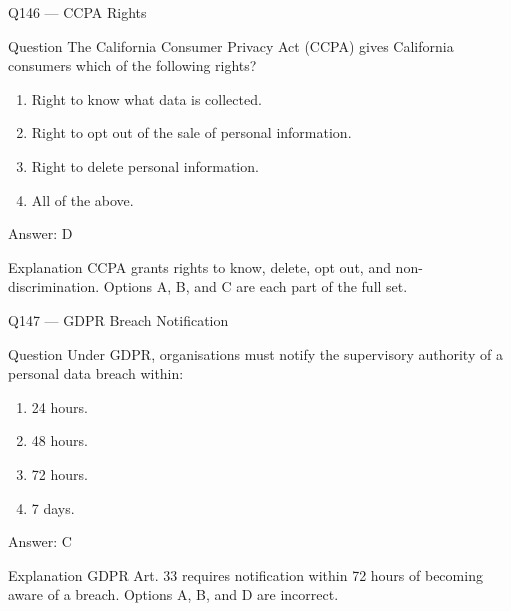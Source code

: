 \documentclass[aspectratio=169,8pt]{beamer}
\begin{document}
\begin{frame}{Q146 --- CCPA Rights}
\begin{block}{Question}
The California Consumer Privacy Act (CCPA) gives California consumers which of the following rights?
\begin{enumerate}
\item Right to know what data is collected.
\item Right to opt out of the sale of personal information.
\item Right to delete personal information.
\item All of the above.
\end{enumerate} 	\end{block}
\begin{exampleblock}{Answer: D}\end{exampleblock}
\begin{block}{Explanation}
CCPA grants rights to know, delete, opt out, and non-discrimination. Options A, B, and C are each part of the full set.
\end{block}
\end{frame}

\begin{frame}{Q147 --- GDPR Breach Notification}
\begin{block}{Question}
Under GDPR, organisations must notify the supervisory authority of a personal data breach within:
\begin{enumerate}
\item 24 hours.
\item 48 hours.
\item 72 hours.
\item 7 days.
\end{enumerate} 	\end{block}
\begin{exampleblock}{Answer: C}\end{exampleblock}
\begin{block}{Explanation}
GDPR Art. 33 requires notification within 72 hours of becoming aware of a breach. Options A, B, and D are incorrect.
\end{block}
\end{frame}
\end{document}
